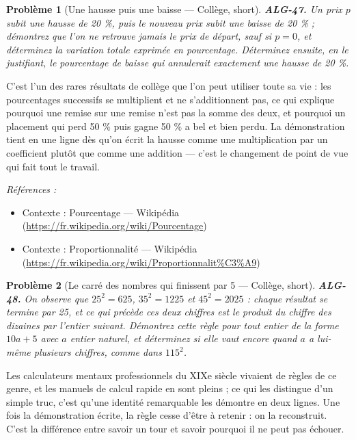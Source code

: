 \documentclass[11pt]{article}
\newtheorem{problem}{Problème}
\newenvironment{refs}{\par\small\noindent\emph{Références :}\begin{itemize}\setlength\itemsep{0pt}}{\end{itemize}\normalsize}
\begin{document}
\begin{problem}[{Une hausse puis une baisse --- Collège, short}]
\textbf{ALG-47.} Un prix $ p $ subit une hausse de 20 \%, puis le nouveau prix
subit une baisse de 20 \% ; démontrez que l'on ne retrouve jamais le prix de départ, sauf si
$ p = 0 $, et déterminez la variation totale exprimée en pourcentage. Déterminez ensuite, en le
justifiant, le pourcentage de baisse qui annulerait exactement une hausse de 20 \%.
\end{problem}

\noindent C'est l'un des rares résultats de collège que l'on peut utiliser toute sa vie :
les pourcentages successifs se multiplient et ne s'additionnent pas, ce qui explique pourquoi une
remise sur une remise n'est pas la somme des deux, et pourquoi un placement qui perd 50 \% puis
gagne 50 \% a bel et bien perdu. La démonstration tient en une ligne dès qu'on écrit la hausse comme
une multiplication par un coefficient plutôt que comme une addition --- c'est le changement de point
de vue qui fait tout le travail.

\begin{refs}
\item Contexte : Pourcentage --- Wikipédia (\url{https://fr.wikipedia.org/wiki/Pourcentage})
\item Contexte : Proportionnalité --- Wikipédia (\url{https://fr.wikipedia.org/wiki/Proportionnalit%C3%A9})
\end{refs}

\bigskip

\begin{problem}[{Le carré des nombres qui finissent par 5 --- Collège, short}]
\textbf{ALG-48.} On observe que $ 25^2 = 625 $, $ 35^2 = 1225 $ et
$ 45^2 = 2025 $ : chaque résultat se termine par 25, et ce qui précède ces deux chiffres est le
produit du chiffre des dizaines par l'entier suivant. Démontrez cette règle pour tout entier de la
forme $ 10a + 5 $ avec $ a $ entier naturel, et déterminez si elle vaut encore quand $ a $ a
lui-même plusieurs chiffres, comme dans $ 115^2 $.
\end{problem}

\noindent Les calculateurs mentaux professionnels du XIXe siècle vivaient de
règles de ce genre, et les manuels de calcul rapide en sont pleins ; ce qui les distingue d'un
simple truc, c'est qu'une identité remarquable les démontre en deux lignes. Une fois la
démonstration écrite, la règle cesse d'être à retenir : on la reconstruit. C'est la différence
entre savoir un tour et savoir pourquoi il ne peut pas échouer.
\end{document}

